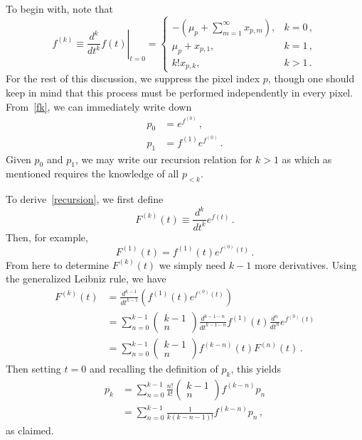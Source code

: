 To begin with, note that
\begin{equation}
f^{(k)} \equiv \left. \frac{d^k}{dt^k} f(t) \right|_{t=0} = \left\{ \begin{array}{lc} -(\mu_p + \sum_{m=1}^{\infty} x_{p,m}), & k=0\,, \\ \mu_p + x_{p,1}, & k=1\,, \\ k! x_{p,k}, & k > 1\,. \end{array} \right.
\label{fk}
\end{equation}
For the rest of this discussion, we suppress the pixel index $p$, though one should keep in mind that this process must be performed independently in every pixel.
From~\eqref{fk}, we can immediately write down
\begin{equation}\begin{aligned}
p_0 &= e^{f^{(0)}}\,, \\
p_1 &= f^{(1)} e^{f^{(0)}}\,.
\end{aligned}\end{equation}
Given $p_0$ and $p_1$, we may write our recursion relation for $k > 1$ as
which as mentioned requires the knowledge of all $p_{< k}$. 

To derive~\eqref{recursion}, we first define
\begin{equation}
F^{(k)}(t) \equiv \frac{d^k}{dt^k} e^{f(t)}\,.
\end{equation}
Then, for example,
\begin{equation}
F^{(1)}(t) = f^{(1)}(t) e^{f^{(0)}(t)}\,.
\end{equation}
From here to determine $F^{(k)}(t)$ we simply need $k-1$ more derivatives. Using the generalized Leibniz rule, we have
\begin{equation}\begin{aligned}
F^{(k)}(t) &= \frac{d^{k-1}}{dt^{k-1}} \left( f^{(1)}(t) e^{f^{(0)}(t)} \right) \\
&= \sum_{n=0}^{k-1} \begin{pmatrix} k-1 \\ n \end{pmatrix} \frac{d^{k-1-n}}{dt^{k-1-n}} f^{(1)}(t) \frac{d^n}{dt^n} e^{f^{(0)}(t)} \\
&= \sum_{n=0}^{k-1} \begin{pmatrix} k-1 \\ n \end{pmatrix} f^{(k-n)}(t) F^{(n)}(t)\,.
\end{aligned}\end{equation}
Then setting $t=0$ and recalling the definition of $p_k$, this yields
\begin{equation}\begin{aligned}
p_k &= \sum_{n=0}^{k-1} \frac{n!}{k!} \begin{pmatrix} k-1 \\ n \end{pmatrix} f^{(k-n)} p_n \\
&= \sum_{n=0}^{k-1} \frac{1}{k(k-n-1)!} f^{(k-n)} p_n\,,
\end{aligned}\end{equation}
as claimed.

